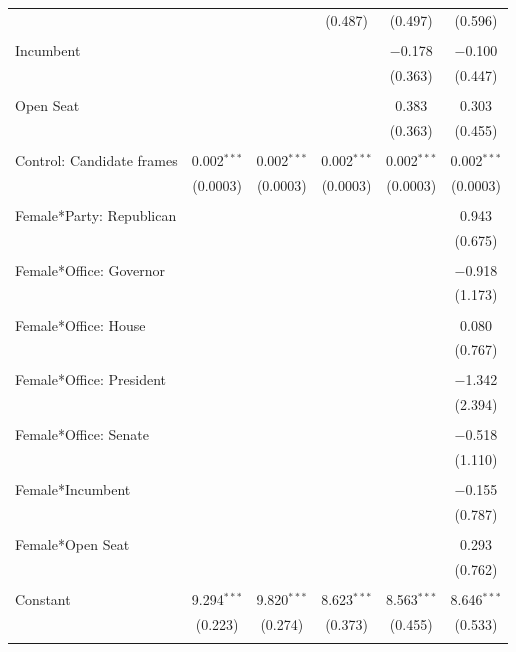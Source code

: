 \begin{table}[!htbp]
\begin{tabular}{@{\extracolsep{5pt}}lccccc}
  &  &  & (0.487) & (0.497) & (0.596) \\ 
  & & & & & \\ 
 Incumbent &  &  &  & $-$0.178 & $-$0.100 \\ 
  &  &  &  & (0.363) & (0.447) \\ 
  & & & & & \\ 
 Open Seat &  &  &  & 0.383 & 0.303 \\ 
  &  &  &  & (0.363) & (0.455) \\ 
  & & & & & \\ 
 Control: Candidate frames & 0.002$^{***}$ & 0.002$^{***}$ & 0.002$^{***}$ & 0.002$^{***}$ & 0.002$^{***}$ \\ 
  & (0.0003) & (0.0003) & (0.0003) & (0.0003) & (0.0003) \\ 
  & & & & & \\ 
 Female*Party: Republican &  &  &  &  & 0.943 \\ 
  &  &  &  &  & (0.675) \\ 
  & & & & & \\ 
 Female*Office: Governor &  &  &  &  & $-$0.918 \\ 
  &  &  &  &  & (1.173) \\ 
  & & & & & \\ 
 Female*Office: House &  &  &  &  & 0.080 \\ 
  &  &  &  &  & (0.767) \\ 
  & & & & & \\ 
 Female*Office: President &  &  &  &  & $-$1.342 \\ 
  &  &  &  &  & (2.394) \\ 
  & & & & & \\ 
 Female*Office: Senate &  &  &  &  & $-$0.518 \\ 
  &  &  &  &  & (1.110) \\ 
  & & & & & \\ 
 Female*Incumbent &  &  &  &  & $-$0.155 \\ 
  &  &  &  &  & (0.787) \\ 
  & & & & & \\ 
 Female*Open Seat &  &  &  &  & 0.293 \\ 
  &  &  &  &  & (0.762) \\ 
  & & & & & \\ 
 Constant & 9.294$^{***}$ & 9.820$^{***}$ & 8.623$^{***}$ & 8.563$^{***}$ & 8.646$^{***}$ \\ 
  & (0.223) & (0.274) & (0.373) & (0.455) & (0.533) \\ 
  & & & & & \\ 

\end{tabular}
\end{table}
